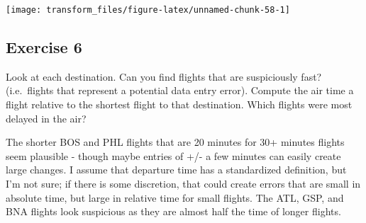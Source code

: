 \documentclass[]{book}
\newenvironment{Shaded}{\begin{snugshade}}{\end{snugshade}}
\newcommand{\CommentTok}[1]{\textcolor[rgb]{0.56,0.35,0.01}{\textit{#1}}}
\newcommand{\DataTypeTok}[1]{\textcolor[rgb]{0.13,0.29,0.53}{#1}}
\newcommand{\KeywordTok}[1]{\textcolor[rgb]{0.13,0.29,0.53}{\textbf{#1}}}
\newcommand{\NormalTok}[1]{#1}
\newcommand{\OperatorTok}[1]{\textcolor[rgb]{0.81,0.36,0.00}{\textbf{#1}}}
\newcommand{\StringTok}[1]{\textcolor[rgb]{0.31,0.60,0.02}{#1}}
\theoremstyle{plain}
\theoremstyle{remark}
\theoremstyle{definition}
\theoremstyle{definition}
\theoremstyle{definition}
\theoremstyle{remark}
\begin{document}
\begin{Shaded}
\end{Shaded}

\begin{center}\texttt{[image: transform\_files/figure-latex/unnamed-chunk-58-1]} \end{center}

\hypertarget{exercise-6-4}{%
\subsection{Exercise 6}\label{exercise-6-4}}

Look at each destination. Can you find flights that are suspiciously
fast? (i.e.~flights that represent a potential data entry error).
Compute the air time a flight relative to the shortest flight to that
destination. Which flights were most delayed in the air?

The shorter BOS and PHL flights that are 20 minutes for 30+ minutes
flights seem plausible - though maybe entries of +/- a few minutes can
easily create large changes. I assume that departure time has a
standardized definition, but I'm not sure; if there is some discretion,
that could create errors that are small in absolute time, but large in
relative time for small flights. The ATL, GSP, and BNA flights look
suspicious as they are almost half the time of longer flights.
\end{document}
